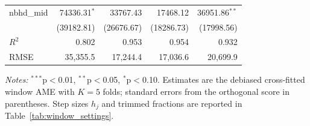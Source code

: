 \begin{table}[htbp]
\begin{threeparttable}
\begin{tabular}{lrrrr}
nbhd\_mid & 74336.31$^{*}$ & 33767.43 & 17468.12 & 36951.86$^{**}$ \\
 & (39182.81) & (26676.67) & (18286.73) & (17998.56) \\
\midrule
$R^2$ & 0.802 & 0.953 & 0.954 & 0.932 \\
RMSE & 35,355.5 & 17,244.4 & 17,036.6 & 20,699.9 \\
\bottomrule
\end{tabular}
\begin{tablenotes}
\footnotesize
\item \textit{Notes:} $^{***}$p$<$0.01, $^{**}$p$<$0.05, $^{*}$p$<$0.10. Estimates are the debiased cross-fitted window AME with $K=5$ folds; standard errors from the orthogonal score in parentheses. Step sizes $h_j$ and trimmed fractions are reported in Table~\ref{tab:window_settings}.
\end{tablenotes}
\end{threeparttable}
\end{table}